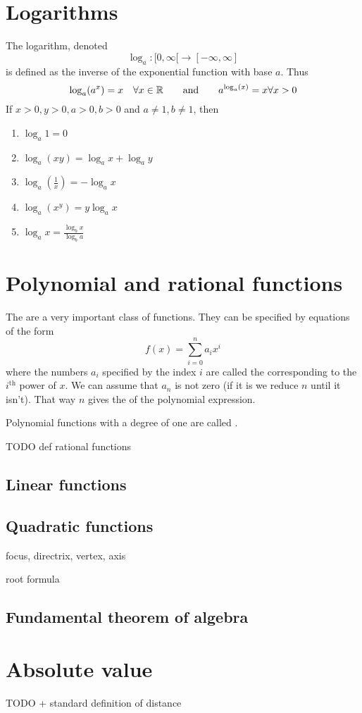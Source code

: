 \section{Logarithms}
The logarithm, denoted
\[ \log_a: [0,\infty[ \to [-\infty, \infty] \]
is defined as the inverse of the exponential function with base $a$. Thus
\[ \log_a(a^x) = x \quad \forall x\in\mathbb{R} \qquad \text{and} \qquad a^{\log_a(x)}=x \forall x>0 \]
If $x>0, y>0, a>0, b>0$ and $a \neq 1, b\neq 1$, then
\begin{enumerate}
\item $\log_a 1 = 0$
\item $\log_a(xy) = \log_a x + \log_a y$
\item $\log_a(\frac{1}{x}) = -\log_a x$
\item $\log_a(x^y) = y\log_a x$
\item $\log_a x = \frac{\log_b x}{\log_b a}$
\end{enumerate}


\section{Polynomial and rational functions}
The  are a very important class of functions. They can be specified by equations of the form
\[ f(x) = \sum_{i=0}^n a_i x^i \]
where the numbers $a_i$ specified by the index $i$ are called the  corresponding to the $i^\text{th}$ power of $x$. We can assume that $a_n$ is not zero (if it is we reduce $n$ until it isn't). That way $n$ gives the  of the polynomial expression.

Polynomial functions with a degree of one are called .

TODO def rational functions

\subsection{Linear functions}
\subsection{Quadratic functions}
focus, directrix, vertex, axis

root formula

\subsection{Fundamental theorem of algebra}

\section{Absolute value}
TODO + standard definition of distance
